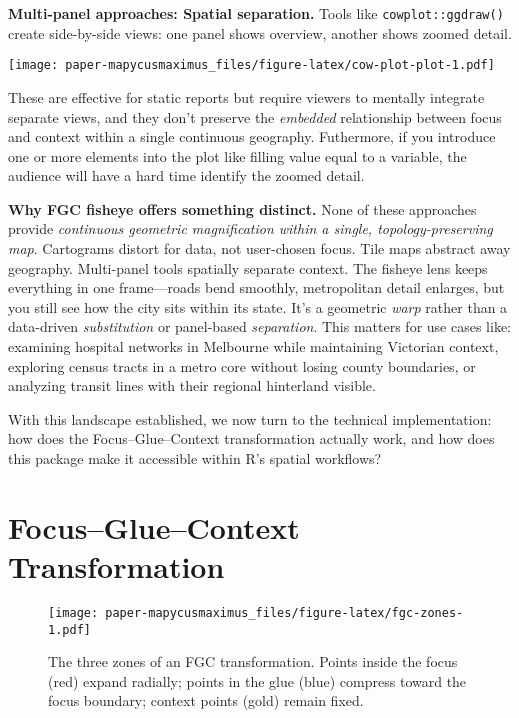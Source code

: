 \textbf{Multi-panel approaches: Spatial separation.} Tools like \texttt{cowplot::ggdraw()}\citep{cowplot} create side-by-side views: one panel shows overview, another shows zoomed detail.

\texttt{[image: paper-mapycusmaximus\_files/figure-latex/cow-plot-plot-1.pdf]}

These are effective for static reports but require viewers to mentally integrate separate views, and they don't preserve the \emph{embedded} relationship between focus and context within a single continuous geography. Futhermore, if you introduce one or more elements into the plot like filling value equal to a variable, the audience will have a hard time identify the zoomed detail.

\textbf{Why FGC fisheye offers something distinct.} None of these approaches provide \emph{continuous geometric magnification within a single, topology-preserving map}. Cartograms distort for data, not user-chosen focus. Tile maps abstract away geography. Multi-panel tools spatially separate context. The fisheye lens keeps everything in one frame---roads bend smoothly, metropolitan detail enlarges, but you still see how the city sits within its state. It's a geometric \emph{warp} rather than a data-driven \emph{substitution} or panel-based \emph{separation}. This matters for use cases like: examining hospital networks in Melbourne while maintaining Victorian context, exploring census tracts in a metro core without losing county boundaries, or analyzing transit lines with their regional hinterland visible.

With this landscape established, we now turn to the technical implementation: how does the Focus--Glue--Context transformation actually work, and how does this package make it accessible within R's spatial workflows?

\hypertarget{focusgluecontext-transformation}{%
\section{Focus--Glue--Context Transformation}\label{focusgluecontext-transformation}}

\begin{figure}
\centering
\texttt{[image: paper-mapycusmaximus\_files/figure-latex/fgc-zones-1.pdf]}
\caption{\label{fig:fgc-zones}The three zones of an FGC transformation. Points inside the focus (red) expand radially; points in the glue (blue) compress toward the focus boundary; context points (gold) remain fixed.}
\end{figure}

